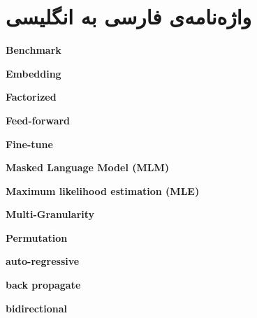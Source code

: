 \chapter*{واژه‌نامه‌ی فارسی به انگلیسی}
\pagestyle{style9}
\begin{multicols*}{2}


{\bf Benchmark  }
\vspace*{3mm}



{\bf Embedding}
\vspace*{3mm}



{\bf Factorized }
\vspace*{3mm}



{\bf Feed-forward}
\vspace*{3mm}



{\bf Fine-tune }
\vspace*{3mm}



{\bf Masked Language Model (MLM) }
\vspace*{3mm}



{\bf Maximum likelihood estimation (MLE) }
\vspace*{3mm}



{\bf Multi-Granularity }
\vspace*{3mm}



{\bf Permutation}
\vspace*{3mm}



{\bf auto-regressive }
\vspace*{3mm}



{\bf back propagate}
\vspace*{3mm}



{\bf bidirectional   }
\vspace*{3mm}




\end{multicols*}

